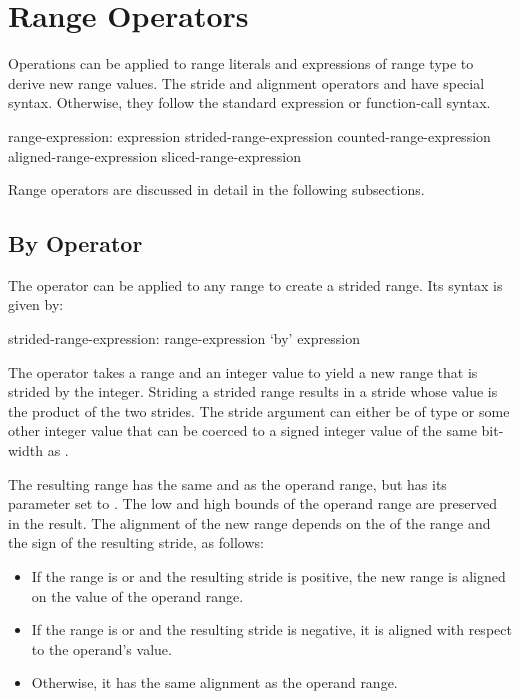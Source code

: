\section{Range Operators}
\label{Range_Operators}

Operations can be applied to range literals and expressions of range type to
derive new range values.  The stride and alignment operators 
and  have special syntax.  Otherwise, they follow the standard
expression or function-call syntax.
\begin{syntax}
range-expression:
  expression
  strided-range-expression
  counted-range-expression
  aligned-range-expression
  sliced-range-expression
\end{syntax}

Range operators are discussed in detail in the following subsections.

\subsection{By Operator}
\label{By_Operator_For_Ranges}

The  operator can be applied to any range to create a strided
range.  Its syntax is given by:
\begin{syntax}
strided-range-expression:
  range-expression `by' expression
\end{syntax}

The  operator takes a range and an integer value to yield a
new range that is strided by the integer.  Striding a strided range
results in a stride whose value is the product of the two strides.
The stride argument can either be of type  or some other
integer value that can be coerced to a signed integer value of the same
bit-width as .  

The resulting range has the same  and  as the
operand range, but has its  parameter set to .
The low and high bounds of the operand range are preserved in the result.
The alignment of the new range depends on the  of the range
and the sign of the resulting stride, as follows:
\begin{itemize}
\item If the range is  or  and  the resulting stride is positive, the new range is aligned on
the  value of the operand range.  
\item If the range
is  or  and  the resulting stride is
negative, it is aligned with respect to the operand's  value.
\item Otherwise, it has the same alignment as the operand range.
\end{itemize}

